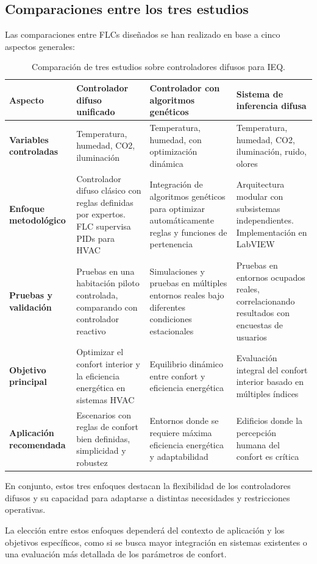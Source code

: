 \subsection{Comparaciones entre los tres estudios}

Las comparaciones entre FLCs diseñados se han realizado en base a cinco aspectos generales:

\begin{table}[H]
	\centering
	\renewcommand{\arraystretch}{1.5}
	\begin{tabular}{|p{2.5cm}|p{4cm}|p{4cm}|p{4cm}|}
		\hline
		\rowcolor{lightgray}
		\textbf{Aspecto} & \textbf{Controlador difuso unificado} & \textbf{Controlador con algoritmos genéticos} & \textbf{Sistema de inferencia difusa} \\ \hline
		
		\textbf{Variables controladas} & 
		Temperatura, humedad, CO2, iluminación & 
		Temperatura, humedad, con optimización dinámica & 
		Temperatura, humedad, CO2, iluminación, ruido, olores \\ \hline
		
		\textbf{Enfoque metodológico} & 
		Controlador difuso clásico con reglas definidas por expertos. FLC supervisa PIDs para HVAC & 
		Integración de algoritmos genéticos para optimizar automáticamente reglas y funciones de pertenencia & 
		Arquitectura modular con subsistemas independientes. Implementación en LabVIEW \\ \hline
		
		\textbf{Pruebas y validación} & 
		Pruebas en una habitación piloto controlada, comparando con controlador reactivo & 
		Simulaciones y pruebas en múltiples entornos reales bajo diferentes condiciones estacionales & 
		Pruebas en entornos ocupados reales, correlacionando resultados con encuestas de usuarios \\ \hline
		
		\textbf{Objetivo principal} & 
		Optimizar el confort interior y la eficiencia energética en sistemas HVAC & 
		Equilibrio dinámico entre confort y eficiencia energética & 
		Evaluación integral del confort interior basado en múltiples índices \\ \hline
		
		\textbf{Aplicación recomendada} & 
		Escenarios con reglas de confort bien definidas, simplicidad y robustez & 
		Entornos donde se requiere máxima eficiencia energética y adaptabilidad & 
		Edificios donde la percepción humana del confort es crítica \\ \hline
	\end{tabular}
	\caption{Comparación de tres estudios sobre controladores difusos para IEQ.}
	\label{tab:comparacion}
\end{table}

En conjunto, estos tres enfoques destacan la flexibilidad de los controladores difusos y su capacidad para adaptarse a distintas necesidades y restricciones operativas.

La elección entre estos enfoques dependerá del contexto de aplicación y los objetivos específicos, como si se busca mayor integración en sistemas existentes o una evaluación más detallada de los parámetros de confort.